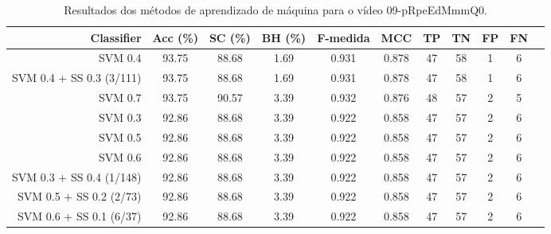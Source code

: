 \begin{table}[!htb]
\centering
\caption{Resultados dos métodos de aprendizado de máquina para o vídeo 09-pRpeEdMmmQ0.}
\label{tab:09-pRpeEdMmmQ0}
\begin{tabular}{r|c|c|c|c|c|c|c|c|c|c}
\hline\hline
Classifier & Acc (\%) & SC (\%) & BH (\%) & F-medida & MCC & TP & TN & FP & FN \\ \hline
SVM 0.4 & 93.75 & 88.68 & 1.69 & 0.931 & 0.878 & 47 & 58 & 1 & 6 \\ 
SVM 0.4 + SS 0.3 (3/111) & 93.75 & 88.68 & 1.69 & 0.931 & 0.878 & 47 & 58 & 1 & 6 \\ 
SVM 0.7 & 93.75 & 90.57 & 3.39 & 0.932 & 0.876 & 48 & 57 & 2 & 5 \\ 
SVM 0.3 & 92.86 & 88.68 & 3.39 & 0.922 & 0.858 & 47 & 57 & 2 & 6 \\ 
SVM 0.5 & 92.86 & 88.68 & 3.39 & 0.922 & 0.858 & 47 & 57 & 2 & 6 \\ 
SVM 0.6 & 92.86 & 88.68 & 3.39 & 0.922 & 0.858 & 47 & 57 & 2 & 6 \\ 
SVM 0.3 + SS 0.4 (1/148) & 92.86 & 88.68 & 3.39 & 0.922 & 0.858 & 47 & 57 & 2 & 6 \\ 
SVM 0.5 + SS 0.2 (2/73) & 92.86 & 88.68 & 3.39 & 0.922 & 0.858 & 47 & 57 & 2 & 6 \\ 
SVM 0.6 + SS 0.1 (6/37) & 92.86 & 88.68 & 3.39 & 0.922 & 0.858 & 47 & 57 & 2 & 6 \\ 
\hline\hline
\end{tabular}
\end{table}
